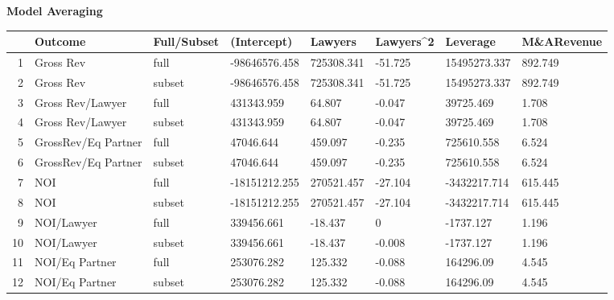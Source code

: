 \documentclass{article}
\begin{document}
\newpage
{\large \textbf{Model Averaging} }%
\begin{table}[H]
\centering
\begin{tabular}{rlllllll}
  \hline
 & Outcome & Full/Subset & (Intercept) & Lawyers & Lawyers^2 & Leverage & M\&ARevenue \\ 
  \hline
1 & Gross Rev & full & -98646576.458 & 725308.341 & -51.725 & 15495273.337 & 892.749 \\ 
  2 & Gross Rev & subset & -98646576.458 & 725308.341 & -51.725 & 15495273.337 & 892.749 \\ 
  3 & Gross Rev/Lawyer & full & 431343.959 & 64.807 & -0.047 & 39725.469 & 1.708 \\ 
  4 & Gross Rev/Lawyer & subset & 431343.959 & 64.807 & -0.047 & 39725.469 & 1.708 \\ 
  5 & GrossRev/Eq Partner & full & 47046.644 & 459.097 & -0.235 & 725610.558 & 6.524 \\ 
  6 & GrossRev/Eq Partner & subset & 47046.644 & 459.097 & -0.235 & 725610.558 & 6.524 \\ 
  7 & NOI & full & -18151212.255 & 270521.457 & -27.104 & -3432217.714 & 615.445 \\ 
  8 & NOI & subset & -18151212.255 & 270521.457 & -27.104 & -3432217.714 & 615.445 \\ 
  9 & NOI/Lawyer & full & 339456.661 & -18.437 & 0 & -1737.127 & 1.196 \\ 
  10 & NOI/Lawyer & subset & 339456.661 & -18.437 & -0.008 & -1737.127 & 1.196 \\ 
  11 & NOI/Eq Partner & full & 253076.282 & 125.332 & -0.088 & 164296.09 & 4.545 \\ 
  12 & NOI/Eq Partner & subset & 253076.282 & 125.332 & -0.088 & 164296.09 & 4.545 \\ 
   \hline
\end{tabular}
\end{table}
\end{document}
